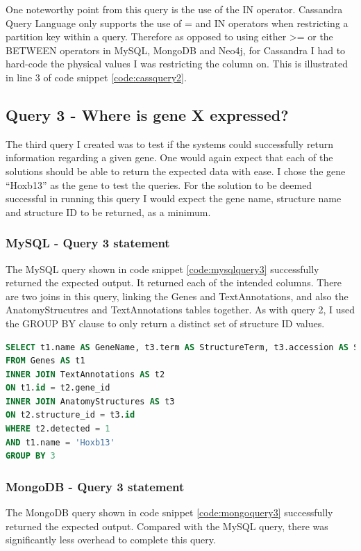 One noteworthy point from this query is the use of the IN operator. Cassandra Query Language only supports the use of = and IN operators when restricting a partition key within a query. Therefore as opposed to using either >= or the BETWEEN operators in MySQL, MongoDB and Neo4j, for Cassandra I had to hard-code the physical values I was restricting the column on. This is illustrated in line 3 of code snippet \ref{code:cassquery2}.

\subsection*{Query 3 - Where is gene X expressed?}\label{query3}
The third query I created was to test if the systems could successfully return information regarding a given gene. One would again expect that each of the solutions should be able to return the expected data with ease. I chose the gene ``Hoxb13'' as the gene to test the queries. For the solution to be deemed successful in running this query I would expect the gene name, structure name and structure ID to be returned, as a minimum.

\subsubsection*{MySQL - Query 3 statement}\label{mysqlquery3statement}
The MySQL query shown in code snippet \ref{code:mysqlquery3} successfully returned the expected output. It returned each of the intended columns. There are two joins in this query, linking the Genes and TextAnnotations, and also the AnatomyStrucutres and TextAnnotations tables together. As with query 2, I used the GROUP BY clause to only return a distinct set of structure ID values.

\begin{lstlisting}[language=SQL, caption=MySQL query 3 statement. Where is gene X expressed?., label=code:mysqlquery3]
SELECT t1.name AS GeneName, t3.term AS StructureTerm, t3.accession AS StructureID
FROM Genes AS t1
INNER JOIN TextAnnotations AS t2
ON t1.id = t2.gene_id
INNER JOIN AnatomyStructures AS t3
ON t2.structure_id = t3.id
WHERE t2.detected = 1
AND t1.name = 'Hoxb13'
GROUP BY 3
\end{lstlisting}
\newpage
\subsubsection*{MongoDB - Query 3 statement}\label{mongoquery3statement}
The MongoDB query shown in code snippet \ref{code:mongoquery3} successfully returned the expected output. Compared with the MySQL query, there was significantly less overhead to complete this query.

